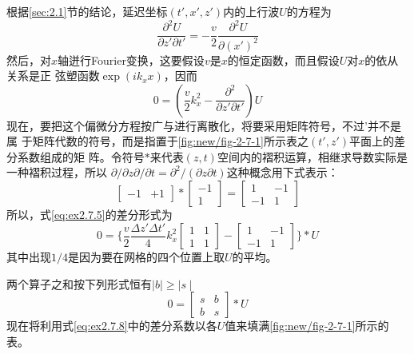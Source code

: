 根据\ref{sec:2.1}节的结论，延迟坐标$(t',x',z')$内的上行波$U$的方程为
\begin{equation}
\frac{\partial^2 U}{\partial z'\partial t'}=-\frac{v}{2}\frac{\partial^2 U}{\partial (x')^2}
\label{eq:ex2.7.4}
\end{equation}
然后，对$x$轴迸行Fourier变换，这要假设$v$是$x$的恒定函数，而且假设$U$对$x$的依从关系是正
弦塑函数$\exp(ik_xx)$，因而
\begin{equation}
0=(\frac{v}{2}k_x^2-\frac{\partial^2 }{\partial z'\partial t'})U
\label{eq:ex2.7.5}
\end{equation}
现在，要把这个偏微分方程按广与进行离散化，将要采用矩阵符号，不过'并不是属
于矩阵代数的符号，而是指置于\ref{fig:new/fig-2-7-1}所示表之$(t',z')$平面上的差分系数组成的矩
阵。令符号$*$来代表$(z,t)$空间内的褶积运算，相继求导数实际是一种褶积过程，所以
$\partial/\partial z \partial/\partial t=\partial^2/(\partial z\partial t)$这种概念用下式表示：
\begin{equation}
\begin{bmatrix}
-1 & +1
\end{bmatrix}
*
\begin{bmatrix}
-1 \\
1
\end{bmatrix}
=
\begin{bmatrix}
1&-1\\
-1&1
\end{bmatrix}
\label{eq:ex2.7.6}
\end{equation}
所以，式\ref{eq:ex2.7.5}的差分形式为
\begin{equation}
0=\{\frac{v}{2}\frac{\Delta z'\Delta t'}{4}k_x^2
\begin{bmatrix}
1&1\\
1&1
\end{bmatrix}
-
\begin{bmatrix}
1&-1\\
-1&1
\end{bmatrix}
\}*U
\label{eq:ex2.7.7}
\end{equation}
其中出现$1/4$是因为要在网格的四个位置上取$U$的平均。

两个算子之和按下列形式恒有$\mid b \mid \geq \mid s \mid $
\begin{equation}
0 =
\begin{bmatrix}
s&b\\
b&s
\end{bmatrix}
*U
\label{eq:ex2.7.8}
\end{equation}
现在将利用式\ref{eq:ex2.7.8}中的差分系数以各$U$值来填满\ref{fig:new/fig-2-7-1}所示的表。

